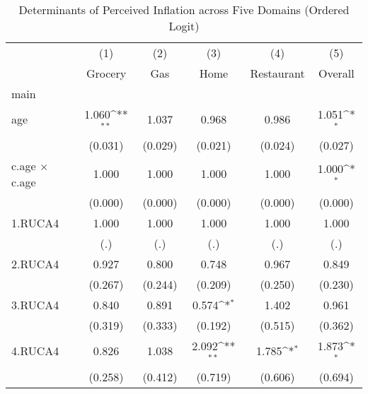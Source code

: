 \begin{table}[htbp]\centering
\def\sym#1{\ifmmode^{#1}\else\(^{#1}\)\fi}
\caption{Determinants of Perceived Inflation across Five Domains (Ordered Logit)}
\begin{tabular}{l*{5}{c}}
\hline\hline
                &\multicolumn{1}{c}{(1)}&\multicolumn{1}{c}{(2)}&\multicolumn{1}{c}{(3)}&\multicolumn{1}{c}{(4)}&\multicolumn{1}{c}{(5)}\\
                &\multicolumn{1}{c}{Grocery}&\multicolumn{1}{c}{Gas}&\multicolumn{1}{c}{Home}&\multicolumn{1}{c}{Restaurant}&\multicolumn{1}{c}{Overall}\\
\hline
main            &                  &                  &                  &                  &                  \\
age             &    1.060\sym{**} &    1.037         &    0.968         &    0.986         &    1.051\sym{*}  \\
                &  (0.031)         &  (0.029)         &  (0.021)         &  (0.024)         &  (0.027)         \\
[1em]
c.age $\times$ c.age&    1.000         &    1.000         &    1.000         &    1.000         &    1.000\sym{*}  \\
                &  (0.000)         &  (0.000)         &  (0.000)         &  (0.000)         &  (0.000)         \\
[1em]
1.RUCA4         &    1.000         &    1.000         &    1.000         &    1.000         &    1.000         \\
                &      (.)         &      (.)         &      (.)         &      (.)         &      (.)         \\
[1em]
2.RUCA4         &    0.927         &    0.800         &    0.748         &    0.967         &    0.849         \\
                &  (0.267)         &  (0.244)         &  (0.209)         &  (0.250)         &  (0.230)         \\
[1em]
3.RUCA4         &    0.840         &    0.891         &    0.574\sym{*}  &    1.402         &    0.961         \\
                &  (0.319)         &  (0.333)         &  (0.192)         &  (0.515)         &  (0.362)         \\
[1em]
4.RUCA4         &    0.826         &    1.038         &    2.092\sym{**} &    1.785\sym{*}  &    1.873\sym{*}  \\
                &  (0.258)         &  (0.412)         &  (0.719)         &  (0.606)         &  (0.694)         \\

\end{tabular}
\end{table}
